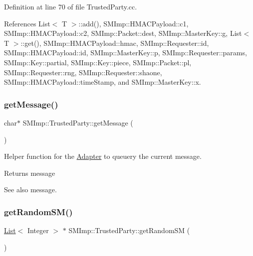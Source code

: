 Definition at line 70 of file Trusted\+Party.\+cc.



References List$<$ T $>$\+::add(), S\+M\+Imp\+::\+H\+M\+A\+C\+Payload\+::c1, S\+M\+Imp\+::\+H\+M\+A\+C\+Payload\+::c2, S\+M\+Imp\+::\+Packet\+::dest, S\+M\+Imp\+::\+Master\+Key\+::g, List$<$ T $>$\+::get(), S\+M\+Imp\+::\+H\+M\+A\+C\+Payload\+::hmac, S\+M\+Imp\+::\+Requester\+::id, S\+M\+Imp\+::\+H\+M\+A\+C\+Payload\+::id, S\+M\+Imp\+::\+Master\+Key\+::p, S\+M\+Imp\+::\+Requester\+::params, S\+M\+Imp\+::\+Key\+::partial, S\+M\+Imp\+::\+Key\+::piece, S\+M\+Imp\+::\+Packet\+::pl, S\+M\+Imp\+::\+Requester\+::rng, S\+M\+Imp\+::\+Requester\+::shaone, S\+M\+Imp\+::\+H\+M\+A\+C\+Payload\+::time\+Stamp, and S\+M\+Imp\+::\+Master\+Key\+::x.

\mbox{\label{classSMImp_1_1TrustedParty_ab15efea2439c964eec1f0cdae82843ac}} 
\subsubsection{\texorpdfstring{get\+Message()}{getMessage()}}
{\footnotesize\ttfamily char$\ast$ S\+M\+Imp\+::\+Trusted\+Party\+::get\+Message (\begin{DoxyParamCaption}{ }\end{DoxyParamCaption})}

Helper function for the \hyperlink{classAdapter}{Adapter} to queuery the current message. \begin{DoxyReturn}{Returns}
message 
\end{DoxyReturn}
\begin{DoxySeeAlso}{See also}
message. 
\end{DoxySeeAlso}
\mbox{\label{classSMImp_1_1TrustedParty_a8c0452d2d9842a1c24ebf6dffac9529a}} 
\subsubsection{\texorpdfstring{get\+Random\+S\+M()}{getRandomSM()}}
{\footnotesize\ttfamily \hyperlink{classList}{List}$<$ Integer $>$ $\ast$ S\+M\+Imp\+::\+Trusted\+Party\+::get\+Random\+SM (\begin{DoxyParamCaption}{ }\end{DoxyParamCaption})}

